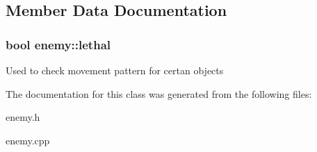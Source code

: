 \subsection{\-Member \-Data \-Documentation}
\hypertarget{classenemy_a89eadc9a59757ee451a82d6570c2d9da}{
\subsubsection[{lethal}]{\setlength{\rightskip}{0pt plus 5cm}bool {\bf enemy\-::lethal}}}\label{classenemy_a89eadc9a59757ee451a82d6570c2d9da}
\-Used to check movement pattern for certan objects 

\-The documentation for this class was generated from the following files\-:\begin{DoxyCompactItemize}
\item 
enemy.\-h\item 
enemy.\-cpp\end{DoxyCompactItemize}

